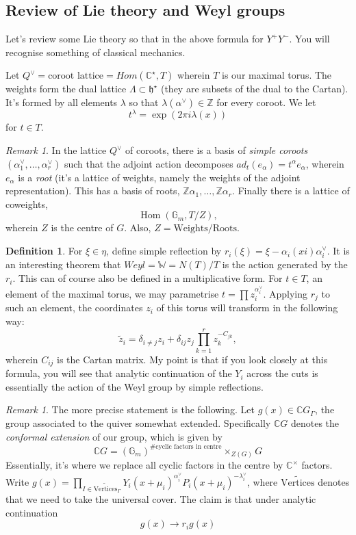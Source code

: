 \documentclass[leqno, openany]{memoir}
\theoremstyle{definition}
\newtheorem{defn}[thm]{Definition}
\theoremstyle{remark}
\newtheorem{rmk}[thm]{Remark}
\theoremstyle{plain}
\theoremstyle{definition}
\theoremstyle{remark}
\newcommand{\mr}[1]{\mathrm{#1}}
\newcommand{\wt}[1]{\widetilde{#1}}
\DeclareMathOperator{\Hom}{Hom}
\begin{document}
\subsection{Review of Lie theory and Weyl groups}

Let's review some Lie theory so that in the above formula for $Y^+Y^-$.
You will recognise something of classical mechanics. 

Let $Q^\vee = \text{coroot lattice} = Hom(\mathbb{C}^\star, T)$ wherein $T$ is our maximal torus. 
The weights form the dual lattice $\Lambda \subset \mathfrak{h}^\star$ (they are subsets of the dual to the Cartan). It's formed by all elements 
$\lambda$ so that $\lambda(\alpha^\vee) \in \mathbb{Z}$ for every coroot.
We let 
\[
t^\lambda = \exp (2 \pi i \lambda(x))
\]
for $t \in T$. 

\begin{rmk}
In the lattice $Q^\vee$ of coroots, there is a basis of \emph{simple coroots} 
$(\alpha_1^\vee,\dots,\alpha_r^\vee)$ such that the adjoint 
action decomposes $ad_t(e_\alpha) = t^\alpha e_\alpha$, wherein $e_\alpha$ is a \emph{root} (it's a lattice of weights, namely the weights of the adjoint representation).
This has a basis of roots, $\mathbb{Z}\alpha_1,\dots,\mathbb{Z}\alpha_r$. 
Finally there is a lattice of coweights, 
\[
\Hom(\mathbb{G}_m, T/Z),
\]
wherein $Z$ is the centre of $G$. Also, $Z = \mr{Weights}/\mr{Roots}$.
\end{rmk}

\begin{defn}
For $\xi \in \eta$, define simple reflection by $r_i(\xi) = \xi - \alpha_i(xi)\alpha_i^\vee$.
It is an interesting theorem that $Weyl = \mathbb{W} = N(T)/T$ is the action generated by the $r_i$.
This can of course also be defined in a multiplicative form. For $t \in T$, an element of the maximal torus, 
we may parametrise $t = \prod z_i^{\alpha_i^\vee}$. 
Applying $r_j$ to such an element, the coordinates $z_i$ of this torus will transform 
in the following way: 
\[
\wt{z}_i = \delta_{i\neq j} z_i + \delta_{ij} z_j \prod_{k= 1}^r z_k^{-C_{jk}},
\]
wherein $C_{ij}$ is the Cartan matrix. My point is that if you look closely at this formula, you will 
see that analytic continuation of the $Y_i$ across the cuts is 
essentially the action of the Weyl group by simple reflections. 
\end{defn}

\begin{rmk}
The more precise statement is the following. Let $g(x) \in \mathbb{C}G_\Gamma$, the group associated to the quiver somewhat extended. Specifically $\mathbb{C}G$ denotes the \emph{conformal extension} of our group, which is given by
\[
\mathbb{C}G = (\mathbb{G}_m)^{\#\text{cyclic factors in centre}} \times_{Z(G)} G 
\]
Essentially, it's where we replace all cyclic factors in the centre by $\mathbb{C}^\times$ factors.
Write $g(x) = \prod_{I \in \wt{\mr{Vertices}}_\Gamma} Y_i(x + \mu_i)^{\alpha_i^\vee} P_i(x  + \mu_i)^{-\lambda_i^\vee} $, where $\wt{\mr{Vertices}}$ denotes that we need to take the universal cover.
The claim is that under analytic continuation 
\[
g(x) \to r_i g(x) 
\]
\end{rmk}
\end{document}
